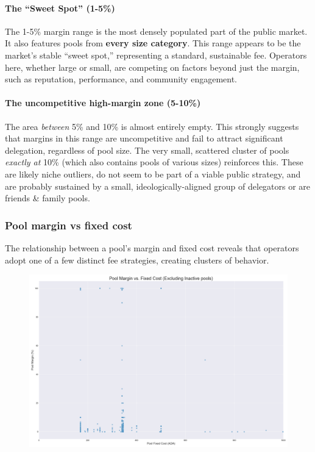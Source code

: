 \documentclass[11pt, letterpaper]{article}
\begin{document}
\paragraph{The ``Sweet Spot'' (1-5\%)}
The 1-5\% margin range is the most densely populated part of the
public market. It also features pools from \textbf{every size category}. This
range appears to be the market's stable ``sweet spot,'' representing a standard,
sustainable fee. Operators here, whether large or small, are competing on
factors beyond just the margin, such as reputation, performance, and
community engagement.

\paragraph{The uncompetitive high-margin zone (5-10\%)}
The area \textit{between} 5\% and 10\% is almost entirely empty. This
strongly suggests that margins in this range are uncompetitive and
fail to attract significant delegation, regardless of pool size. The
very small, scattered cluster of pools \textit{exactly at} 10\%
(which also contains pools of various sizes) reinforces this. These are
likely niche outliers, do not seem to be part of a viable public strategy, and are
probably sustained by a small, ideologically-aligned group of delegators or are
friends \& family pools.

\subsubsection{Pool margin vs fixed cost}
The relationship between a pool's margin and fixed cost reveals that operators
adopt one of a few distinct fee strategies, creating clusters of behavior.

\begin{figure}[H]
	\centering
	\includegraphics[width=\textwidth]{img/pool_cost_vs_margin.png}
\end{figure}
\end{document}
